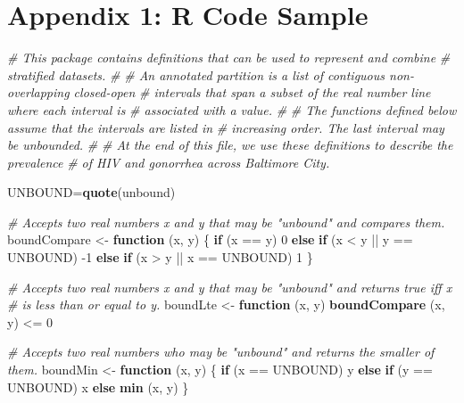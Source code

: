 \documentclass[]{article}
\newenvironment{Shaded}{}{}
\newcommand{\CommentTok}[1]{\textcolor[rgb]{0.38,0.63,0.69}{\textit{#1}}}
\newcommand{\ControlFlowTok}[1]{\textcolor[rgb]{0.00,0.44,0.13}{\textbf{#1}}}
\newcommand{\DecValTok}[1]{\textcolor[rgb]{0.25,0.63,0.44}{#1}}
\newcommand{\KeywordTok}[1]{\textcolor[rgb]{0.00,0.44,0.13}{\textbf{#1}}}
\newcommand{\NormalTok}[1]{#1}
\newcommand{\OperatorTok}[1]{\textcolor[rgb]{0.40,0.40,0.40}{#1}}
\newcommand{\StringTok}[1]{\textcolor[rgb]{0.25,0.44,0.63}{#1}}
\begin{document}
\hypertarget{appendix-1-r-code-sample}{%
\section{Appendix 1: R Code Sample}\label{appendix-1-r-code-sample}}

\begin{Shaded}
\begin{Highlighting}[]
\CommentTok{# This package contains definitions that can be used to represent and combine}
\CommentTok{# stratified datasets.}
\CommentTok{#}
\CommentTok{# An annotated partition is a list of contiguous non-overlapping closed-open}
\CommentTok{# intervals that span a subset of the real number line where each interval is}
\CommentTok{# associated with a value.}
\CommentTok{#}
\CommentTok{# The functions defined below assume that the intervals are listed in}
\CommentTok{# increasing order. The last interval may be unbounded.}
\CommentTok{#}
\CommentTok{# At the end of this file, we use these definitions to describe the prevalence}
\CommentTok{# of HIV and gonorrhea across Baltimore City.}

\NormalTok{UNBOUND=}\KeywordTok{quote}\NormalTok{(unbound)}

\CommentTok{# Accepts two real numbers x and y that may be "unbound" and compares them.}
\NormalTok{boundCompare <-}\StringTok{ }\ControlFlowTok{function}\NormalTok{ (x, y) \{}
  \ControlFlowTok{if}\NormalTok{ (x }\OperatorTok{==}\StringTok{ }\NormalTok{y) }\DecValTok{0}
  \ControlFlowTok{else} \ControlFlowTok{if}\NormalTok{ (x }\OperatorTok{<}\StringTok{ }\NormalTok{y }\OperatorTok{||}\StringTok{ }\NormalTok{y }\OperatorTok{==}\StringTok{ }\NormalTok{UNBOUND) }\DecValTok{-1}
  \ControlFlowTok{else} \ControlFlowTok{if}\NormalTok{ (x }\OperatorTok{>}\StringTok{ }\NormalTok{y }\OperatorTok{||}\StringTok{ }\NormalTok{x }\OperatorTok{==}\StringTok{ }\NormalTok{UNBOUND) }\DecValTok{1}
\NormalTok{\}}

\CommentTok{# Accepts two real numbers x and y that may be "unbound" and returns true iff x}
\CommentTok{# is less than or equal to y.}
\NormalTok{boundLte <-}\StringTok{ }\ControlFlowTok{function}\NormalTok{ (x, y) }\KeywordTok{boundCompare}\NormalTok{ (x, y) }\OperatorTok{<=}\StringTok{ }\DecValTok{0}

\CommentTok{# Accepts two real numbers who may be "unbound" and returns the smaller of them.}
\NormalTok{boundMin <-}\StringTok{ }\ControlFlowTok{function}\NormalTok{ (x, y) \{}
  \ControlFlowTok{if}\NormalTok{ (x }\OperatorTok{==}\StringTok{ }\NormalTok{UNBOUND) y}
  \ControlFlowTok{else} \ControlFlowTok{if}\NormalTok{ (y }\OperatorTok{==}\StringTok{ }\NormalTok{UNBOUND) x}
  \ControlFlowTok{else} \KeywordTok{min}\NormalTok{ (x, y)}
\NormalTok{\}}


\end{Highlighting}
\end{Shaded}
\end{document}
